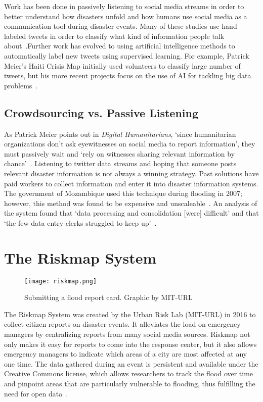 Work has been done in passively listening to social media streams in order
to better understand how disasters unfold and how humans use social media as a
communication tool during disaster events. Many of these studies use hand
labeled tweets in order to classify what kind of information people talk
about~\cite{alamTwitterTaleThree2018}.Further work has evolved to using
artificial intelligence methods to automatically label new tweets using
supervised learning. For example, Patrick Meier's Haiti Crisis Map initially
used volunteers to classify large number of tweets, but his more recent projects
focus on the use of AI for tackling big data
problems~\cite{meierDigitalHumanitariansHow2015}.

\subsection{Crowdsourcing vs. Passive Listening} 
As Patrick Meier points out in \textit{Digital Humanitarians}, `since
humanitarian organizations don't ask eyewitnesses on social media to report
information', they must passively wait and `rely on witnesses sharing relevant
information by chance'~\cite{meierDigitalHumanitariansHow2015}. Listening to
twitter data streams and hoping that someone posts relevant disaster information
is not always a winning strategy. Past solutions have paid
workers to collect information and enter it into disaster information
systems. The government of Mozambique used this technique during flooding in
2007; however, this method was found to be expensive and
unscaleable~\cite{aminDataNaturalDisasters2008}. An analysis of the system found
that `data processing and consolidation [were] difficult' and that `the few data
entry clerks struggled to keep up'~\cite{aminDataNaturalDisasters2008}.

\section{The Riskmap System}\label{chap1:riskmap}
  \begin{figure}
    \texttt{[image: riskmap.png]}
    \caption{Submitting a flood report card. Graphic by MIT-URL}\label{fig:cards}
  \end{figure}
  The Riskmap System was created by the Urban Risk Lab (MIT-URL) in 2016 to
  collect citizen reports on disaster events. It alleviates the load on
  emergency managers by centralizing reports from many social media
  sources. Riskmap not only makes it easy for reports to come into the
  response center, but it also allows emergency managers to indicate which areas
  of a city are most affected at any one time. The data gathered during an
  event is persistent and available under the Creative Commons license,
  which allows researchers to track the flood over time and pinpoint areas that
  are particularly vulnerable to flooding, thus fulfilling the need
  for open data~\cite{PhilippinesPDCCollaborate,
  antaranews.comBNPBPetaBencanaId}.

